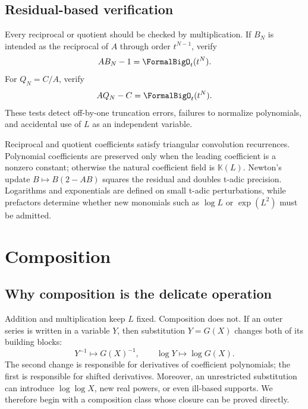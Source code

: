 \documentclass[11pt,openany]{book}
\theoremstyle{definition}
\theoremstyle{plain}
\theoremstyle{remark}
\newcommand{\K}{\mathbb{K}}
\begin{document}
\section{Residual-based verification}
Every reciprocal or quotient should be checked by multiplication.  If
\(B_N\) is intended as the reciprocal of \(A\) through order \(t^{N-1}\), verify
\begin{equation}\label{eq:recip-residual-test}
 AB_N-1=\FormalBigO_t(t^N).
\end{equation}
For \(Q_N=C/A\), verify
\[
 AQ_N-C=\FormalBigO_t(t^N).
\]
These tests detect off-by-one truncation errors, failures to normalize
polynomials, and accidental use of \(L\) as an independent variable.

\begin{summarybox}
Reciprocal and quotient coefficients satisfy triangular convolution
recurrences.  Polynomial coefficients are preserved only when the leading
coefficient is a nonzero constant; otherwise the natural coefficient field is
\(\K(L)\).  Newton's update \(B\mapsto B(2-AB)\) squares the residual and
doubles t-adic precision.  Logarithms and exponentials are defined on small
t-adic perturbations, while prefactors determine whether new monomials such as
\(\log L\) or \(\exp(L^2)\) must be admitted.
\end{summarybox}

\chapter{Composition}\label{ch:composition}

\section{Why composition is the delicate operation}
Addition and multiplication keep \(L\) fixed.  Composition does not.  If an
outer series is written in a variable \(Y\), then substitution \(Y=G(X)\)
changes both of its building blocks:
\[
 Y^{-1}\longmapsto G(X)^{-1},
 \qquad
 \log Y\longmapsto\log G(X).
\]
The second change is responsible for derivatives of coefficient polynomials;
the first is responsible for shifted derivatives.  Moreover, an unrestricted
substitution can introduce \(\log\log X\), new real powers, or even ill-based
supports.  We therefore begin with a composition class whose closure can be
proved directly.
\end{document}
